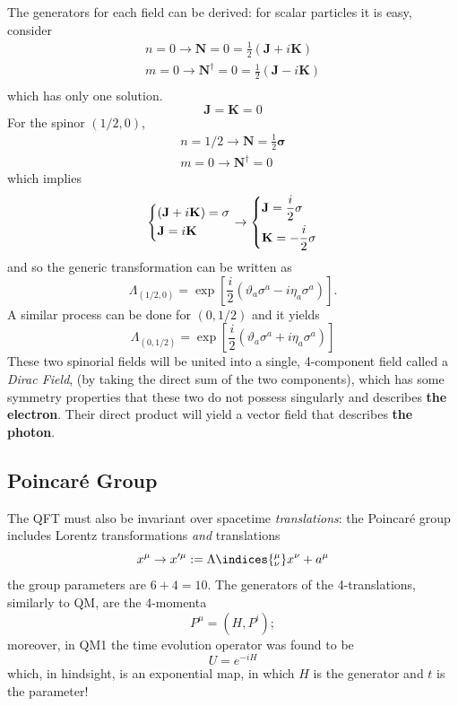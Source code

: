 The generators for each field can be derived: for scalar particles it is easy,
consider
\begin{gather*}
n=0\rightarrow \mathbf{N}=0=\frac{1}{2}\left(\mathbf{J}+i\mathbf{K}\right)\\
m=0\rightarrow \mathbf{N^\dagger}=0=\frac{1}{2}\left(\mathbf{J}-i\mathbf{K}\right)\\
\end{gather*}
which has only one solution.
$$\mathbf{J}=\mathbf{K}=0$$
For the spinor $\left(1/2,0\right)$,
\begin{gather*}
n=1/2\rightarrow\mathbf{N} = \frac{1}{2}\mathbf{\sigma}\\
m=0\rightarrow\mathbf{N^\dagger} = 0
\end{gather*}
which implies
$$\begin{dcases*}
  \left(\mathbf{J}+i\mathbf{K}\right)=\mathbf{\sigma}\\
  \mathbf{J} = i\mathbf{K}
  \end{dcases*} \rightarrow
  \begin{dcases*}
  \mathbf{J} = \frac{i}{2}\mathbf{\sigma}\\
  \mathbf{K} = -\frac{i}{2}\mathbf{\sigma}
  \end{dcases*}
$$
and so the generic transformation can be written as
$$\Lambda_{(1/2,0)} = \exp\left[\frac{i}{2}\left(\vartheta_a\sigma^a-
i\eta_a\sigma^a\right)\right].$$
A similar process can be done for $(0,1/2)$ and it yields
$$\Lambda_{(0,1/2)} = \exp\left[\frac{i}{2}\left(\vartheta_a\sigma^a+
i\eta_a\sigma^a\right)\right]$$
These two spinorial fields will be united into a single, 4-component field called
a \textit{Dirac Field}, (by taking the direct sum of the two components),
which has some symmetry properties that these two do not possess singularly and
describes \textbf{the electron}. Their direct product will yield a vector field
that describes \textbf{the photon}.
%
\subsection{Poincaré Group}
The QFT must also be invariant over spacetime \textit{translations}: the Poincaré
group includes Lorentz transformations \textit{and} translations
$$x^\mu\rightarrow x'^\mu:=\Lambda\indices{^\mu_\nu}x^\nu + a^\mu$$
the group parameters are $6+4=10$. The generators of the 4-translations,
similarly to QM, are the 4-momenta
$$P^\mu = (H,P^i);$$
moreover, in QM1 the time evolution operator was found to be
$$U=e^{-iH}$$
which, in hindsight, is an exponential map, in which $H$ is the generator and $t$ is
the parameter!

